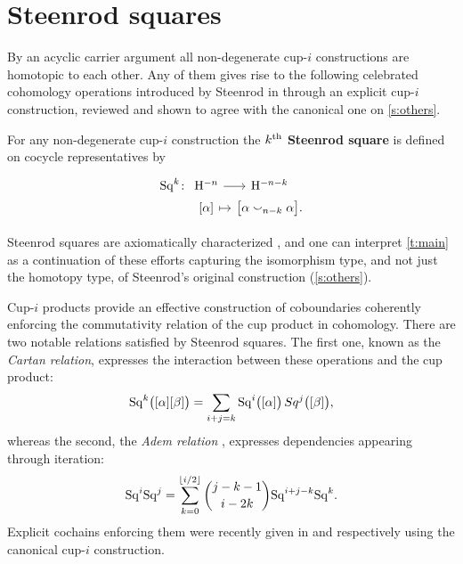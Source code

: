 
\section{Steenrod squares} \label{s:squares}

By an acyclic carrier argument \cite{eilenberg1953acyclic} all non-degenerate cup-$i$ constructions are homotopic to each other.
Any of them gives rise to the following celebrated cohomology operations introduced by Steenrod in \cite{steenrod1947products} through an explicit cup-$i$ construction, reviewed and shown to agree with the canonical one on \cref{s:others}.

\begin{definition}
	For any non-degenerate cup-$i$ construction the \textbf{$k^{\mathrm{th}}$ Steenrod square} is defined on cocycle representatives by
	\[
	\begin{tikzcd} [column sep=tiny, row sep=0]
	\Sq^k \colon &[-10pt] \rH^{-n} \arrow[r] & \rH^{-n-k} \\
	& {[\alpha]} \arrow[r, mapsto] & \big[ \alpha \cup_{n-k} \alpha \big].
	\end{tikzcd}
	\]
\end{definition}

Steenrod squares are axiomatically characterized \cite{steenrod1962cohomology}, and one can interpret \cref{t:main} as a continuation of these efforts capturing the isomorphism type, and not just the homotopy type, of Steenrod's original construction (\cref{s:others}).

\begin{remark}[Relations]
	Cup-$i$ products provide an effective construction of coboundaries coherently enforcing the commutativity relation of the cup product in cohomology.
	There are two notable relations satisfied by Steenrod squares.
	The first one, known as the \textit{Cartan relation}, expresses the interaction between these operations and the cup product:
	\begin{equation*}
	\mathrm{Sq}^k \big( [\alpha] [\beta] \big) =
	\sum_{i+j=k} \mathrm{Sq}^i \big( [\alpha]\big)\, Sq^j \big([\beta] \big),
	\end{equation*}
	whereas the second, the \textit{Adem relation} \cite{adem1952iteration}, expresses dependencies appearing through iteration:
	\begin{equation*}
	\mathrm{Sq}^i \mathrm{Sq}^j =
	\sum_{k=0}^{\lfloor i/2 \rfloor} \binom{j-k-1}{i-2k} \mathrm{Sq}^{i+j-k} \mathrm{Sq}^k.
	\end{equation*}
	Explicit cochains enforcing them were recently given in \cite{medina2020cartan} and \cite{medina2021adem} respectively using the canonical cup-$i$ construction.
\end{remark}


